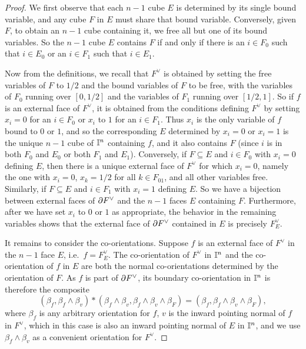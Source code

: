 \begin{proof}
	We first observe that each $n-1$ cube $E$ is determined by its single bound variable, and any cube $F$ in $E$ must share that bound variable.
	Conversely, given $F$, to obtain an $n-1$ cube containing it, we free all but one of its bound variables.
	So the $n-1$ cube $E$ contains $F$ if and only if there is an $i \in F_0$ such that $i \in E_0$ or an $i \in F_1$ such that $i \in E_1$.

	Now from the definitions, we recall that $F^\vee$ is obtained by setting the free variables of $F$ to $1/2$ and the bound variables of $F$ to be free, with the variables of $F_0$ running over $[0,1/2]$ and the variables of $F_1$ running over $[1/2,1]$.
	So if $f$ is an external face of $F^\vee$, it is obtained from the conditions defining $F^\vee$ by setting $x_i=0$ for an $i \in F_0$ or $x_i$ to $1$ for an $i \in F_1$.
	Thus $x_i$ is the only variable of $f$ bound to $0$ or $1$, and so the corresponding $E$ determined by $x_i = 0$ or $x_i = 1$ is the unique $n-1$ cube of $\mathbb{I}^n$ containing $f$, and it also contains $F$ (since $i$ is in both $F_0$ and $E_0$ or both $F_1$ and $E_1$).
	Conversely, if $F \subseteq E$ and $i \in F_0$ with $x_i = 0$ defining $E$, then there is a unique external face of $F^\vee$ for which $x_i = 0$, namely the one with $x_i=0$, $x_k = 1/2$ for all $k \in F_{01}$, and all other variables free.
	Similarly, if $F \subseteq E$ and $i \in F_1$ with $x_i = 1$ defining $E$.
	So we have a bijection between external faces of $\partial F^\vee$ and the $n-1$ faces $E$ containing $F$.
	Furthermore, after we have set $x_i$ to $0$ or $1$ as appropriate, the behavior in the remaining variables shows that the external face of $\partial F^\vee$ contained in $E$ is precisely $F^\vee_E$.

	It remains to consider the co-orientations.
	Suppose $f$ is an external face of $F^\vee$ in the $n-1$ face $E$, i.e.\ $f = F^\vee_E$.
	The co-orientation of $F^\vee$ in $\mathbb{I}^n$ and the co-orientation of $f$ in $E$ are both the normal co-orientations determined by the orientation of $F$.
	As $f$ is part of $\partial F^\vee$, its boundary co-orientation in $\mathbb{I}^n$ is therefore the composite $$(\beta_f,\beta_f \wedge \beta_v)*(\beta_f \wedge \beta_v,\beta_f \wedge \beta_v \wedge \beta_F) = (\beta_f,\beta_f \wedge \beta_v \wedge \beta_F),$$ where $\beta_f$ is any arbitrary orientation for $f$, $v$ is the inward pointing normal of $f$ in $F^\vee$, which in this case is also an inward pointing normal of $E$ in $\mathbb{I}^n$, and we use $\beta_f \wedge \beta_v$ as a convenient orientation for $F^\vee$.
\end{proof}

